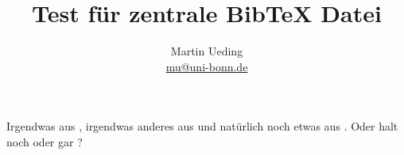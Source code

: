 %


\title{Test für zentrale BibTeX Datei}
\author{Martin Ueding \\ \href{mailto:mu@uni-bonn.de}{mu@uni-bonn.de}}



\maketitle

Irgendwas aus \cite{penrose-cycles_of_time}, irgendwas anderes aus \cite{penrose-computerdenken} und natürlich noch etwas aus \cite{penrose-road_to_reality}. Oder halt noch \cite{mcconnel-rapid_development} oder gar \cite{mcconnel-code_complete}?







